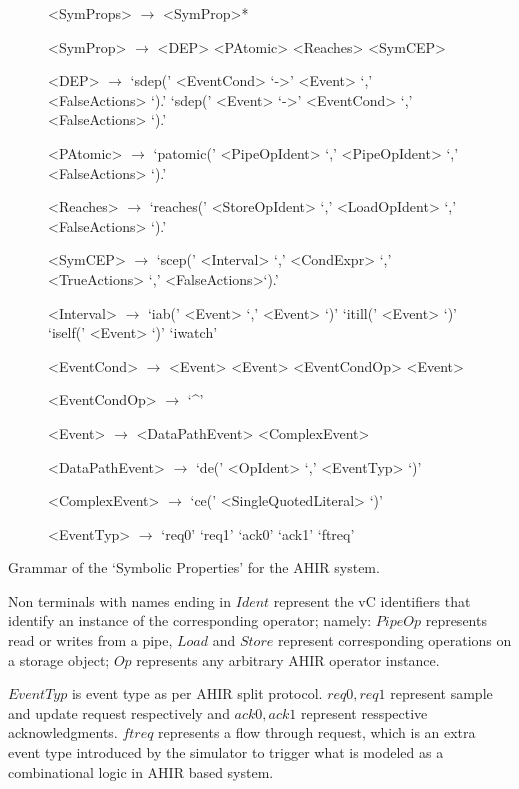 \documentclass[12pt,a4paper]{article}
\begin{document}
\begin{figure}
\begin{grammar}
<SymProps>      $\rightarrow$ <SymProp>*

<SymProp>       $\rightarrow$ <DEP>
                \alt          <PAtomic>
                \alt          <Reaches>
                \alt          <SymCEP>

<DEP>           $\rightarrow$ `sdep(' <EventCond> `->' <Event> `,' <FalseActions> `).'
                \alt          `sdep(' <Event> `->' <EventCond> `,' <FalseActions> `).'

<PAtomic>       $\rightarrow$ `patomic(' <PipeOpIdent> `,' <PipeOpIdent> `,' <FalseActions> `).'

<Reaches>       $\rightarrow$ `reaches(' <StoreOpIdent> `,' <LoadOpIdent> `,' <FalseActions> `).'

<SymCEP>        $\rightarrow$ `scep(' <Interval> `,' <CondExpr> `,' <TrueActions> `,' <FalseActions>`).'

<Interval>      $\rightarrow$ `iab(' <Event> `,' <Event> `)'
                \alt          `itill(' <Event> `)'
                \alt          `iself(' <Event> `)'
                \alt          `iwatch'

<EventCond>     $\rightarrow$ <Event>
                \alt          <Event> <EventCondOp> <Event>

<EventCondOp>   $\rightarrow$ `^'

<Event>         $\rightarrow$ <DataPathEvent>
                \alt          <ComplexEvent>

<DataPathEvent> $\rightarrow$ `de(' <OpIdent> `,' <EventTyp> `)'

<ComplexEvent>  $\rightarrow$ `ce(' <SingleQuotedLiteral> `)'

<EventTyp>      $\rightarrow$ `req0'
                \alt          `req1'
                \alt          `ack0'
                \alt          `ack1'
                \alt          `ftreq'

\end{grammar}
\end{figure}
Grammar of the `Symbolic Properties' for the AHIR system.

Non terminals with names ending in $Ident$ represent the vC identifiers that identify an instance of the corresponding operator; namely: $PipeOp$ represents read or writes from a pipe, $Load$ and $Store$ represent corresponding operations on a storage object; $Op$ represents any arbitrary AHIR operator instance.

$EventTyp$ is event type as per AHIR split protocol. $req0, req1$ represent sample and update request respectively and $ack0, ack1$ represent resspective acknowledgments. $ftreq$ represents a flow through request, which is an extra event type introduced by the simulator to trigger what is modeled as a combinational logic in AHIR based system.
\end{document}
